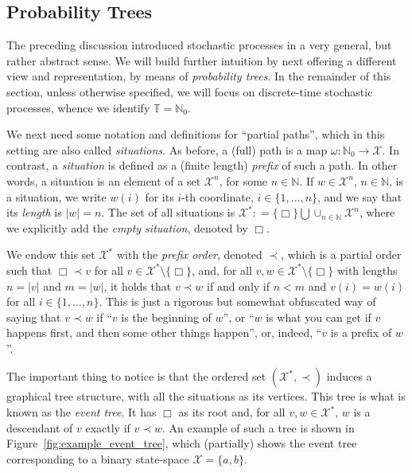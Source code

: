 \documentclass[11pt]{book}
\newcommand{\nats}{\mathbb{N}}
\newcommand{\natswith}{\nats_{0}}
\newcommand{\states}{\mathcal{X}}
\newcommand{\coloneqq}{:\!=}
\newcommand{\timedim}{\mathbb{T}}
\begin{document}
\subsection{Probability Trees}

The preceding discussion introduced stochastic processes in a very general, but rather abstract sense. We will build further intuition by next offering a different view and representation, by means of \emph{probability trees}. In the remainder of this section, unless otherwise specified, we will focus on discrete-time stochastic processes, whence we identify $\timedim=\natswith$.

We next need some notation and definitions for ``partial paths'', which in this setting are also called \emph{situations}. As before, a (full) path is a map $\omega:\natswith\to\states$. In contrast, a \emph{situation} is defined as a (finite length) \emph{prefix} of such a path. In other words, a situation is an element of a set $\states^{n}$, for some $n\in\nats$. If $w\in\states^n$, $n\in\nats$, is a situation, we write $w(i)$ for its $i$-th coordinate, $i\in\{1,\ldots,n\}$, and we say that its \emph{length} is $\lvert w\rvert=n$. The set of all situations is $\states^*\coloneqq \{\Box\}\bigcup \cup_{n\in\nats}\states^n$, where we explicitly add the \emph{empty situation}, denoted by $\Box$.

We endow this set $\states^*$ with the \emph{prefix order}, denoted $\prec$, which is a partial order such that $\Box\prec v$ for all $v\in\states^*\setminus\{\Box\}$, and, for all $v,w\in\states^*\setminus\{\Box\}$ with lengths $n=\lvert v\rvert$ and $m=\lvert w\rvert$, it holds that $v\prec w$ if and only if $n<m$ and $v(i)=w(i)$ for all $i\in\{1,\ldots,n\}$. This is just a rigorous but somewhat obfuscated way of saying that $v\prec w$ if ``$v$ is the beginning of $w$'', or ``$w$ is what you can get if $v$ happens first, and then some other things happen'', or, indeed, ``$v$ is a prefix of $w$''.

The important thing to notice is that the ordered set $(\states^*,\prec)$ induces a graphical tree structure, with all the situations as its vertices. This tree is what is known as the \emph{event tree}. It has $\Box$ as its root and, for all $v,w\in\states^*$, $w$ is a descendant of $v$ exactly if $v\prec w$. An example of such a tree is shown in Figure~\ref{fig:example_event_tree}, which (partially) shows the event tree corresponding to a binary state-space $\states=\{a,b\}$.
\end{document}
